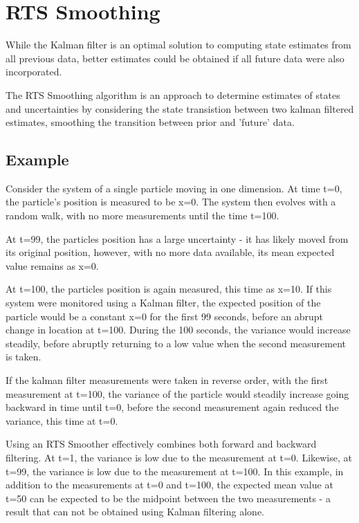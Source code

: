 \chapter{RTS Smoothing} \label{ch:RTS}

While the Kalman filter is an optimal solution to computing state estimates from all previous data, better estimates could be obtained if all future data were also incorporated.

The RTS Smoothing algorithm is an approach to determine estimates of states and uncertainties by considering the state transistion between two kalman filtered estimates, smoothing the transition between prior and 'future' data.

\section{Example} 

Consider the system of a single particle moving in one dimension. At time t=0, the particle's position is measured to be x=0. The system then evolves with a random walk, with no more measurements until the time t=100.

At t=99, the particles position has a large uncertainty - it has likely moved from its original position, however, with no more data available, its mean expected value remains as x=0.

At t=100, the particles position is again measured, this time as x=10. If this system were monitored using a Kalman filter, the expected position of the particle would be a constant x=0 for the first 99 seconds, before an abrupt change in location at t=100. During the 100 seconds, the variance would increase steadily, before abruptly returning to a low value when the second measurement is taken.

If the kalman filter measurements were taken in reverse order, with the first measurement at t=100, the variance of the particle would steadily increase going backward in time until t=0, before the second measurement again reduced the variance, this time at t=0.

Using an RTS Smoother effectively combines both forward and backward filtering. At t=1, the variance is low due to the measurement at t=0. Likewise, at t=99, the variance is low due to the measurement at t=100. In this example, in addition to the measurements at t=0 and t=100, the expected mean value at t=50 can be expected to be the midpoint between the two measurements - a result that can not be obtained using Kalman filtering alone.

